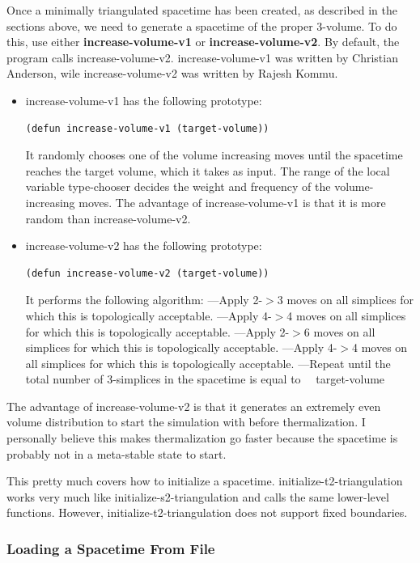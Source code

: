 \message{ !name(programmers_guide.tex)}\documentclass[12pt]{article}
\begin{document}
Once a minimally triangulated spacetime has been created, as described
in the sections above, we need to generate a spacetime of the proper
3-volume. To do this, use either \textbf{increase-volume-v1} or
\textbf{increase-volume-v2}. By default, the program calls
increase-volume-v2. increase-volume-v1 was written by Christian
Anderson, wile increase-volume-v2 was written by Rajesh
Kommu.
\begin{itemize}
\item increase-volume-v1 has the following prototype:
\begin{lstlisting}
(defun increase-volume-v1 (target-volume))
\end{lstlisting}
  It randomly chooses one of the volume increasing moves until the
  spacetime reaches the target volume, which it takes as input. The
  range of the local variable type-chooser decides the weight and
  frequency of the volume-increasing moves. The advantage of
  increase-volume-v1 is that it is more random than
  increase-volume-v2.
\item increase-volume-v2 has the following prototype:
\begin{lstlisting}
(defun increase-volume-v2 (target-volume))
\end{lstlisting}
  It performs the following algorithm:
  \subitem ---Apply 2-$>$3 moves on all simplices for which this is
  topologically acceptable. 
  \subitem ---Apply 4-$>$4 moves on all simplices for which this is 
  topologically acceptable.
  \subitem ---Apply 2-$>$6 moves on all simplices for which this is 
  topologically acceptable.
  \subitem ---Apply 4-$>$4 moves on all simplices for which this is 
  topologically acceptable.
  \subitem ---Repeat until the total number of 3-simplices in the spacetime 
  is equal to \subitem $\quad$target-volume
\end{itemize}
The advantage of increase-volume-v2 is that it generates an extremely
even volume distribution to start the simulation with before
thermalization. I personally believe this makes thermalization go
faster because the spacetime is probably not in a meta-stable state
to start.

This pretty much covers how to initialize a
spacetime. initialize-t2-triangulation works very much like
initialize-s2-triangulation and calls the same lower-level
functions. However, initialize-t2-triangulation does not support fixed
boundaries.

\subsubsection{Loading a Spacetime From File}
\label{sec:load-from-file}
\end{document}
